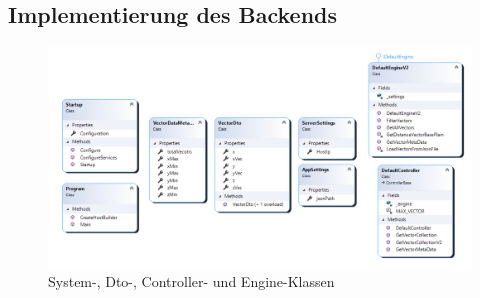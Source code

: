 %	
%		
%		
%	
%	


\FloatBarrier
\subsection{Implementierung des Backends}

\begin{figure}[H]
	\centering
	\includegraphics[width=\linewidth]{images/backend/classDiagram}
	\caption{System-, Dto-, Controller- und Engine-Klassen}
	\label{fig:ClassDiagram}
\end{figure}

